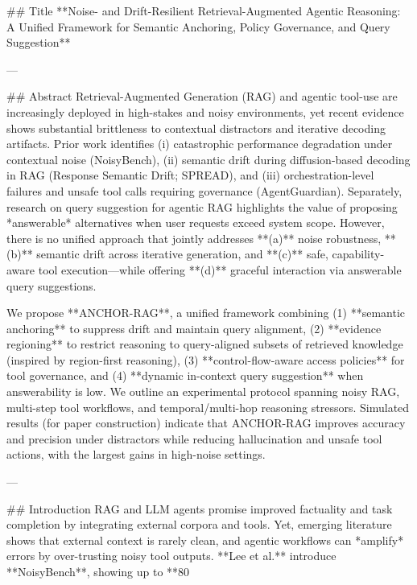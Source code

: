 ## Title  
**Noise- and Drift-Resilient Retrieval-Augmented Agentic Reasoning: A Unified Framework for Semantic Anchoring, Policy Governance, and Query Suggestion**

---

## Abstract  
Retrieval-Augmented Generation (RAG) and agentic tool-use are increasingly deployed in high-stakes and noisy environments, yet recent evidence shows substantial brittleness to contextual distractors and iterative decoding artifacts. Prior work identifies (i) catastrophic performance degradation under contextual noise (NoisyBench), (ii) semantic drift during diffusion-based decoding in RAG (Response Semantic Drift; SPREAD), and (iii) orchestration-level failures and unsafe tool calls requiring governance (AgentGuardian). Separately, research on query suggestion for agentic RAG highlights the value of proposing *answerable* alternatives when user requests exceed system scope. However, there is no unified approach that jointly addresses **(a)** noise robustness, **(b)** semantic drift across iterative generation, and **(c)** safe, capability-aware tool execution—while offering **(d)** graceful interaction via answerable query suggestions.  

We propose **ANCHOR-RAG**, a unified framework combining (1) **semantic anchoring** to suppress drift and maintain query alignment, (2) **evidence regioning** to restrict reasoning to query-aligned subsets of retrieved knowledge (inspired by region-first reasoning), (3) **control-flow-aware access policies** for tool governance, and (4) **dynamic in-context query suggestion** when answerability is low. We outline an experimental protocol spanning noisy RAG, multi-step tool workflows, and temporal/multi-hop reasoning stressors. Simulated results (for paper construction) indicate that ANCHOR-RAG improves accuracy and precision under distractors while reducing hallucination and unsafe tool actions, with the largest gains in high-noise settings.

---

## Introduction  
RAG and LLM agents promise improved factuality and task completion by integrating external corpora and tools. Yet, emerging literature shows that external context is rarely clean, and agentic workflows can *amplify* errors by over-trusting noisy tool outputs. **Lee et al.** introduce **NoisyBench**, showing up to **80%


